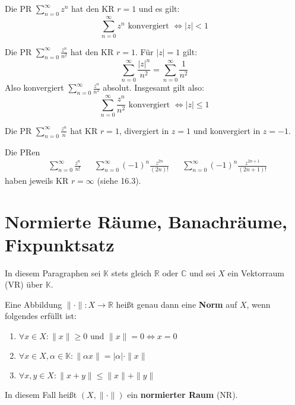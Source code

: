 \documentclass[a4paper,twoside,DIV15,BCOR12mm,chapterprefix=true,headings=twolinechapter]{scrbook}
\begin{document}
\begin{beispiele}
\item Die PR $\sum_{n=0}^\infty z^n$ hat den KR $r=1$ und es gilt:
\[\sum_{n=0}^\infty z^n\text{ konvergiert }\iff |z|<1\]
\item Die PR $\sum_{n=0}^\infty \frac{z^n}{n^2}$ hat den KR $r=1$. Für $|z|=1$ gilt:
\[\sum_{n=0}^\infty \frac{|z|^n}{n^2}=\sum_{n=0}^\infty \frac1{n^2}\]
Also konvergiert $\sum_{n=0}^\infty \frac{z^n}{n^2}$ absolut. Insgesamt gilt also:
\[\sum_{n=0}^\infty \frac{z^n}{n^2}\text{ konvergiert }\iff |z|\le 1\]
\item Die PR $\sum_{n=0}^\infty \frac{z^n}{n}$ hat KR $r=1$, divergiert in $z=1$ und
konvergiert in $z=-1$.
\item Die PRen
\begin{align*}
&\sum_{n=0}^\infty \frac{z^n}{n!}&&\sum_{n=0}^\infty(-1)^n\frac{z^{2n}}{(2n)!}
&&\sum_{n=0}^\infty (-1)^n\frac{z^{2n+1}}{(2n+1)!}
\end{align*}
haben jeweils KR $r=\infty$ (siehe 16.3).
\end{beispiele}

\chapter{Normierte Räume, Banachräume, Fixpunktsatz}
In diesem Paragraphen sei $\mathbb{K}$ stets gleich $\mathbb{R}$ oder $\mathbb{C}$
und sei $X$ ein Vektorraum (VR) über $\mathbb{K}$.

\begin{definition}
Eine Abbildung $\|\cdot\|:X\to\mathbb{R}$ heißt genau dann eine \textbf{Norm} auf $X$,
wenn folgendes erfüllt ist:
\begin{enumerate}
\item $\forall x\in X: \|x\|\ge0 \text{ und } \|x\|=0\iff x=0$
\item $\forall x\in X,\alpha\in\mathbb{K}:\|\alpha x\|=|\alpha|\cdot\|x\|$
\item $\forall x,y\in X: \|x+y\|\le \|x\|+\|y\|$
\end{enumerate}
In diesem Fall heißt $(X,\|\cdot\|)$ ein \textbf{normierter Raum} (NR).
\end{definition}
\end{document}
